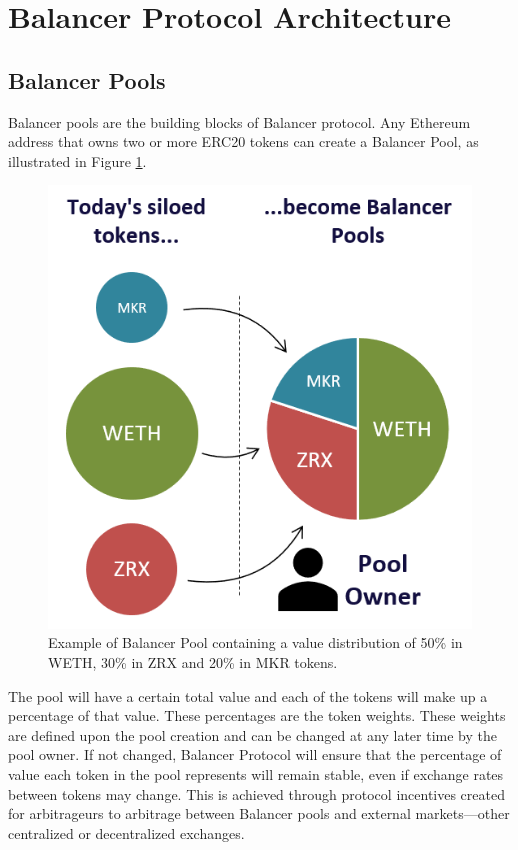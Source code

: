 \documentclass[11pt]{amsart}
\begin{document}
\section{Balancer Protocol Architecture}
\subsection{Balancer Pools}
Balancer pools are the building blocks of Balancer protocol. Any Ethereum address that owns two or more ERC20 tokens can create a Balancer Pool, as illustrated in Figure \ref{fig:example_balancer_pool}.

\begin{figure}
  \includegraphics[]{example_balancer_pool}
  \caption{Example of Balancer Pool containing a value distribution of 50\% in WETH, 30\% in ZRX and 20\% in MKR tokens.}
  \label{fig:example_balancer_pool}
\end{figure}

The pool will have a certain total value and each of the tokens will make up a percentage of that value. These percentages are the token weights. These weights are defined upon the pool creation and can be changed at any later time by the pool owner. If not changed, Balancer Protocol will ensure that the percentage of value each token in the pool represents will remain stable, even if exchange rates between tokens may change. This is achieved through protocol incentives created for arbitrageurs to arbitrage between Balancer pools and external markets---other centralized or decentralized exchanges. 
\end{document}
